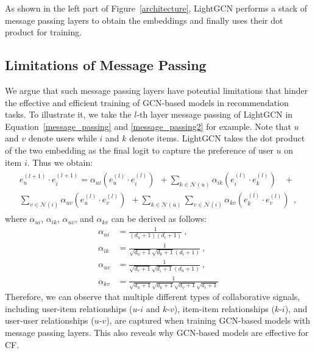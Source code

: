 \documentclass[sigconf,authorversion]{acmart}
\begin{document}
As shown in the left part of Figure~\ref{architecture}, LightGCN performs a stack of message passing layers to obtain the embeddings and finally uses their dot product for training.  


\subsection{Limitations of Message Passing}
\label{limitation_of_mp}
We argue that such message passing layers have potential limitations that hinder the effective and efficient training of GCN-based models in recommendation tasks. To illustrate it, we take the $l$-th layer message passing of LightGCN in Equation~\ref{message_passing} and \ref{message_passing2} for example. Note that $u$ and $v$ denote users while $i$ and $k$ denote items. LightGCN takes the dot product of the two embedding as the final logit to capture the preference of user $u$ on item $i$. Thus we obtain:
\begin{eqnarray}
\begin{aligned}
e_u^{(l+1)} \cdot e_i^{(l+1)} =  \alpha_{ui} (e_u^{(l)} \cdot e_i^{(l)}) ~~+ \sum_{k \in \mathcal{N}(u)}\alpha_{ik}(e_i^{(l)} \cdot e_k^{(l)} )~~~~ + \\ 
\sum_{v \in \mathcal{N}(i)}\alpha_{uv}(e_u^{(l)} \cdot e_v^{(l)}) ~~+
 \sum_{k \in \mathcal{N}(u)}\sum_{v \in \mathcal{N}(i)} \alpha_{kv} (e_k^{(l)} \cdot e_v^{(l)})~~,\label{one_layer_dot_production}	
\end{aligned}
\end{eqnarray}
where $\alpha_{ui}$, $\alpha_{ik}$, $\alpha_{uv}$, and $\alpha_{kv}$ can be derived as follows:
\begin{equation}
	\begin{aligned}
			\alpha_{ui} &= \frac{1}{(d_u + 1)(d_i + 1)}~, \\ 
	\alpha_{ik} &= \frac{1}{\sqrt{{d}_u + 1}\sqrt{ {d}_k + 1}(d_i + 1)}~, \\ 
	\alpha_{uv} &= \frac{1}{\sqrt{{d}_v + 1}\sqrt{ {d}_i + 1}(d_u + 1)}~, \\ 
	\alpha_{kv} &= \frac{1}{\sqrt{{d}_u + 1}\sqrt{ {d}_k + 1}\sqrt{{d}_v + 1}\sqrt{ {d}_i + 1}}  \nonumber
	\end{aligned}
\end{equation}
Therefore, we can observe that multiple different types of collaborative signals, including user-item relationships ($u$-$i$ and $k$-$v$), item-item relationships ($k$-$i$), and user-user relationships ($u$-$v$), are captured when training GCN-based models with message passing layers. 
This also reveals why GCN-based models are effective for CF. 
\end{document}
